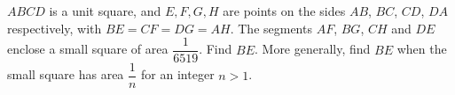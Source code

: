 $ABCD$ is a unit square, and $E,F,G,H$ are points on the sides $AB$, $BC$, $CD$, $DA$ respectively, with $BE=CF=DG=AH$. The segments $AF$, $BG$, $CH$ and $DE$ enclose a small square of area $\dfrac{1}{6519}$. Find $BE$. More generally, find $BE$ when the small square has area $\dfrac1n$ for an integer $n>1$.
